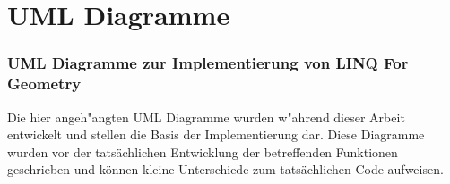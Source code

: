 \documentclass[pagesize, paper=a4, fontsize=12pt,titlepage=true, headings=small, headnosepline, abstractoff, liststotoc, nochapterprefix, plainheadsepline]{scrreprt}
\newcommand{\LFG}{LINQ For Geometry}
\begin{document}
\chapter{UML Diagramme}
\subsection {UML Diagramme zur Implementierung von \LFG}
Die hier angeh"angten UML Diagramme wurden w"ahrend dieser Arbeit entwickelt und stellen die Basis der Implementierung dar. Diese Diagramme wurden vor der tatsächlichen Entwicklung der betreffenden Funktionen geschrieben und können kleine Unterschiede zum tatsächlichen Code aufweisen.
\end{document}
